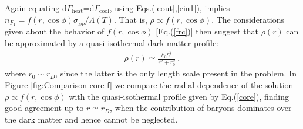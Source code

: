 \documentclass[12pt]{article}
\begin{document}
{{Again equating d$\Gamma _{\text{heat}}$=d$\Gamma _{\text{cool}}$, using Eqs.(\ref{eout},\ref{ein1}), implies $n _{F_1} = f(r,\cos \phi)\sigma _{_{DP}}/\Lambda (T)$. That is, $\rho \propto f(r,\cos \phi )$. The considerations given about the behavior of $f(r,\cos \phi)$ [Eq.(\ref{frc})] then suggest that $\rho (r)$ can be approximated by a quasi-isothermal dark matter profile:
%
\begin{eqnarray}
\rho (r) \simeq \frac{\rho _0r _0 ^2}{r ^2 + r _0 ^2} \ ,
\label{core}
\end{eqnarray}
%
where $r _0 \sim r_D$, since the latter is the only length scale present in the problem. In Figure \ref{fig:Comparison core f} we compare the radial dependence of the solution $\rho \propto f(r,\cos \phi)$ with the quasi-isothermal profile given by Eq.(\ref{core}), finding good agreement up to $r \simeq r _D$, when the contribution of baryons dominates over the dark matter and hence cannot be neglected.

}}
\end{document}
